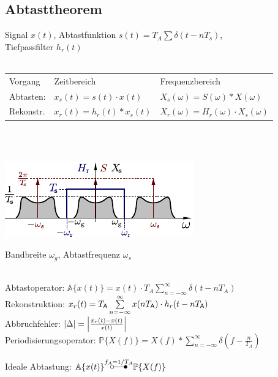 \documentclass[fs, footer]{latex4ei}
\begin{document}
\begin{multicols*}{4}
{\subsection*{Abtasttheorem}
Signal $x(t)$, Abtastfunktion $s(t) = T_A \sum \delta(t-nT_s)$, \\
Tiefpassfilter $h_r(t)$\\
\\
\begin{tabular*}{\columnwidth}{@{\extracolsep\fill}lll@{}}
	Vorgang & Zeitbereich & Frequenzbereich\\
	Abtasten: & $x_s(t) = s(t) \cdot x(t)$ & $X_s(\omega) = S(\omega) * X(\omega)$\\
	Rekonstr. & $x_r(t) = h_r(t) * x_s(t)$ & $X_r(\omega) = H_r(\omega) \cdot X_s(\omega)$\\
\end{tabular*}\\
\\
\begin{center} \includegraphics[scale = 1]{./img/sampletheorem.pdf} \end{center}

Bandbreite $\omega_g$, Abtastfrequenz $\omega_s$\\
\\
 \qquad {}

Abtastoperator: $\mathbb A\{x(t)\} = x(t) \cdot T_A \sum \limits_{n = - \infty}^{\infty} \delta (t - n T_A)$ \\
Rekonstruktion: $x_r(t) = T_{\sf A} \sum \limits_{n = - \infty}^{\infty} x(n T_{\sf A}) \cdot h_r(t - nT_{\sf A})$\\
Abbruchfehler: $\left\vert\Delta\right\vert = \left\vert\frac{x_r(t) - x(t)}{x(t)}\right\vert$\\
Periodisierungsoperator: $\mathbb P \{ X(f) \} = X(f) * \sum \limits_{n = - \infty}^\infty \delta (f - \frac{n}{T_A})$

Ideale Abtastung:
$\mathbb A \{x(t) \} \overset{f_A = 1 / T_A}{\ftsymbol} \mathbb P \{ X(f) \}$
}




\end{multicols*}
\end{document}
